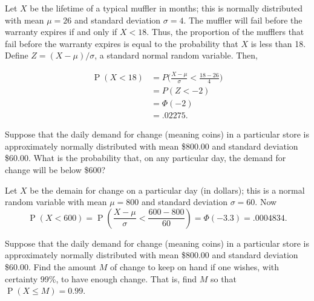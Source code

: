 \documentclass[11pt]{exam}
\DeclareMathOperator*{\Prob}{P}
\renewcommand{\Pr}{\Prob}
\begin{document}
\begin{questions}
\begin{solution}
Let $X$ be the lifetime of a typical muffler in months; this is normally distributed
with mean $\mu = 26$ and standard deviation $\sigma = 4$.  The muffler will
fail before the warranty expires if and only if $X < 18$.  Thus,
the proportion of the mufflers that fail before the warranty expires is
equal to the probability that $X$ is less than 18.  Define $Z = (X -
\mu)/\sigma$, a standard normal random variable.  Then,

\begin{align*}
  \Pr(X < 18) &= P\Big(\frac{X - \mu}{\sigma} < \frac{18-26}{4}\Big) \\
  	&= P(Z < -2) \\
	&= \Phi(-2) \\
	&= .02275.
\end{align*}
\end{solution}

\newpage

\question Suppose that the daily demand for change (meaning coins) in a
particular store is approximately normally distributed with mean \$800.00 and
standard deviation \$60.00.  What is the probability that, on any particular
day, the demand for change will be below \$600?

\begin{solution}
Let $X$ be the demain for change on a particular day (in dollars); this is a
normal random variable with mean $\mu = 800$ and standard deviation $\sigma =
60$.  Now
\[
  \Pr(X < 600) = \Pr\left(\frac{X - \mu}{\sigma} < \frac{600 - 800}{60}\right)
  = \Phi(-3.3) = .0004834.
\]
\end{solution}









\question Suppose that the daily demand for change (meaning coins) in a
particular store is approximately normally distributed with mean \$800.00 and
standard deviation \$60.00.  Find the amount $M$ of change to keep on hand if
one wishes, with certainty 99\%, to have enough change.  That is, find $M$ so
that $\Pr(X \leq M) = 0.99$.


\end{questions}
\end{document}
